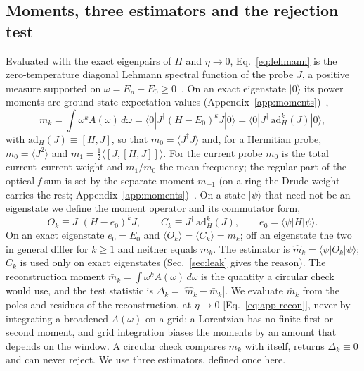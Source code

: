 \documentclass[submission, PhysCore]{SciPost}
\begin{document}
\subsection{Moments, three estimators and the rejection test}\label{sec:estimator}
Evaluated with the exact eigenpairs of $H$ and $\eta\to0$, Eq.~\eqref{eq:lehmann} is the zero-temperature diagonal Lehmann spectral function of the probe $J$, a positive measure supported on ${\omega=E_n-E_0\ge0}$~\cite{Lehmann1954}. On an exact eigenstate $|0\rangle$ its power moments are ground-state expectation values (Appendix~\ref{app:moments})~\cite{HohenbergMartin1965},
\begin{equation}
m_k=\int\omega^kA(\omega)\,d\omega=\langle 0|J^\dagger(H-E_0)^kJ|0\rangle=\langle 0|J^\dagger\,\mathrm{ad}_H^{k}(J)|0\rangle ,
\label{eq:moment-identity}
\end{equation}
with $\mathrm{ad}_H(J)\equiv[H,J]$, so that ${m_0=\langle J^\dagger J\rangle}$ and, for a Hermitian probe, ${m_0=\langle J^2\rangle}$ and ${m_1=\tfrac{1}{2}\langle [J,[H,J]]\rangle}$. For the current probe $m_0$ is the total current--current weight and $m_1/m_0$ the mean frequency; the regular part of the optical \textit{f}-sum is set by the separate moment $m_{-1}$ (on a ring the Drude weight carries the rest; Appendix~\ref{app:moments})~\cite{Kohn1964,Maldague1977}. On a state $|\psi\rangle$ that need not be an eigenstate we define the moment operator and its commutator form,
\begin{equation}
O_k\equiv J^\dagger(H-e_0)^kJ,\qquad C_k\equiv J^\dagger\,\mathrm{ad}_H^{k}(J),\qquad e_0=\langle\psi|H|\psi\rangle .
\label{eq:Ok}
\end{equation}
On an exact eigenstate $e_0=E_0$ and $\langle O_k\rangle=\langle C_k\rangle=m_k$; off an eigenstate the two in general differ for $k\ge1$ and neither equals $m_k$. The estimator is $\widehat m_k=\langle\psi|O_k|\psi\rangle$; $C_k$ is used only on exact eigenstates (Sec.~\ref{sec:leak} gives the reason). The reconstruction moment $\bar{m}_k = \int \omega^k A(\omega)\,d\omega$ is the quantity a circular check would use, and the test statistic is $\Delta_k = |\widehat{m}_k - \bar{m}_k|$. We evaluate $\bar m_k$ from the poles and residues of the reconstruction, at $\eta\to0$ [Eq.~\eqref{eq:app-recon}], never by integrating a broadened $A(\omega)$ on a grid: a Lorentzian has no finite first or second moment, and grid integration biases the moments by an amount that depends on the window. A circular check compares $\bar{m}_k$ with itself, returns $\Delta_k \equiv 0$ and can never reject. We use three estimators, defined once here.
\end{document}
